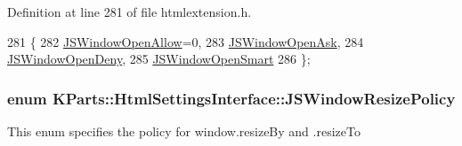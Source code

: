 Definition at line 281 of file htmlextension.\+h.


\begin{DoxyCode}
281                             \{
282         \hyperlink{classKParts_1_1HtmlSettingsInterface_aab245c057a7179fc1bdc16e020750643a079669fa32d8b86f6ae3b50241599431}{JSWindowOpenAllow}=0,
283         \hyperlink{classKParts_1_1HtmlSettingsInterface_aab245c057a7179fc1bdc16e020750643a3b5d146c17900bcb3ac5a3c40762400b}{JSWindowOpenAsk},
284         \hyperlink{classKParts_1_1HtmlSettingsInterface_aab245c057a7179fc1bdc16e020750643a7855bf2e8181c4ed74c47ef5c305ea66}{JSWindowOpenDeny},
285         \hyperlink{classKParts_1_1HtmlSettingsInterface_aab245c057a7179fc1bdc16e020750643aeb4533569b1d543c35bcbe2c13b4e0aa}{JSWindowOpenSmart}
286     \};
\end{DoxyCode}
\hypertarget{classKParts_1_1HtmlSettingsInterface_a0fcf7802e2f831ee1449e82713f6f359}{
\subsubsection[{J\+S\+Window\+Resize\+Policy}]{\setlength{\rightskip}{0pt plus 5cm}enum {\bf K\+Parts\+::\+Html\+Settings\+Interface\+::\+J\+S\+Window\+Resize\+Policy}}}\label{classKParts_1_1HtmlSettingsInterface_a0fcf7802e2f831ee1449e82713f6f359}
This enum specifies the policy for window.\+resize\+By and .resize\+To

